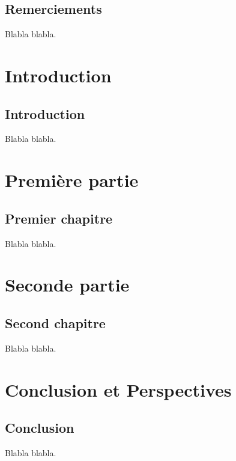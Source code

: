\documentclass[french]{spimufchdr}
\begin{document}
\chapter*{Remerciements}

Blabla blabla.

\tableofcontents

\mainmatter

\part{Introduction}

\chapter{Introduction}

Blabla blabla.

\part{Première partie}

\chapter{Premier chapitre}

Blabla blabla.
 
\part{Seconde partie}

\chapter{Second chapitre}

Blabla blabla.

\part{Conclusion et Perspectives}

\chapter{Conclusion}

Blabla blabla.

\backmatter



\listoffigures
\listoftables
\listofdefinitions
 
\end{document}
